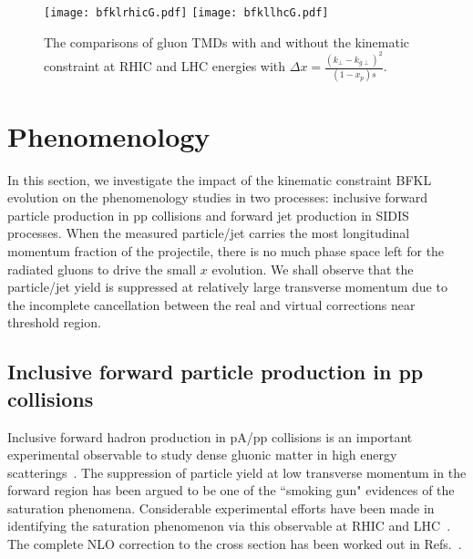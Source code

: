 \documentclass[prd,aps,preprint,tightenlines,nofootinbib,superscriptaddress]{revtex4}
\begin{document}
\begin{figure}[h!]\centering
\texttt{[image: bfklrhicG.pdf]}
\texttt{[image: bfkllhcG.pdf]}
\caption{The comparisons of gluon TMDs with and without the  kinematic constraint at RHIC and LHC energies with $\Delta x= \frac{(k_\perp-k_{g\perp})^2}{(1-x_p)s}$.
}
\label{kcbfkl}
\end{figure}

%






\section{Phenomenology  }
In this section,  we investigate the  impact of the kinematic constraint BFKL evolution on the phenomenology studies in two processes: inclusive forward particle production in pp collisions and  forward jet production in SIDIS processes. When the measured particle/jet carries the most longitudinal momentum fraction of the projectile, there is no much phase space left for the radiated gluons to drive the small $x$ evolution.  We shall observe that the particle/jet yield is  suppressed at relatively large transverse momentum due to the incomplete cancellation between the real and virtual corrections near threshold region.  

\subsection{Inclusive forward  particle production in pp  collisions }
Inclusive forward hadron production in pA/pp collisions is an important experimental observable to study dense gluonic matter in high energy scatterings~\cite{Dumitru:2001jn, Kharzeev:2003wz,Blaizot:2004wu,Blaizot:2004wv,Dumitru:2005gt,Albacete:2010bs,Guzey:2004zp,Altinoluk:2011qy}.  The suppression of particle yield at  low transverse momentum in the forward region has been argued to be one of the ``smoking gun" evidences of the saturation phenomena. Considerable experimental efforts have been made  in  identifying the saturation phenomenon via this observable at RHIC and LHC~\cite{BRAHMS:2004xry,STAR:2006dgg,ALICE:2018vhm,ATLAS:2016xpn,LHCb:2021vww}.
The complete NLO correction to the cross section  has been worked out in Refs.~\cite{Chirilli:2011km,Chirilli:2012jd}.
\end{document}
